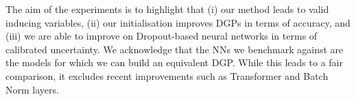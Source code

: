 The aim of the experiments is to highlight that (i) our method leads to valid inducing variables, (ii) our initialisation improves DGPs in terms of accuracy, and (iii) we are able to improve on Dropout-based \citep{Gal2016dropout} neural networks in terms of calibrated uncertainty. 
We acknowledge that the NNs we benchmark against are the models for which we can build an equivalent DGP. While this leads to a fair comparison, it excludes recent improvements such as Transformer and Batch Norm layers.





